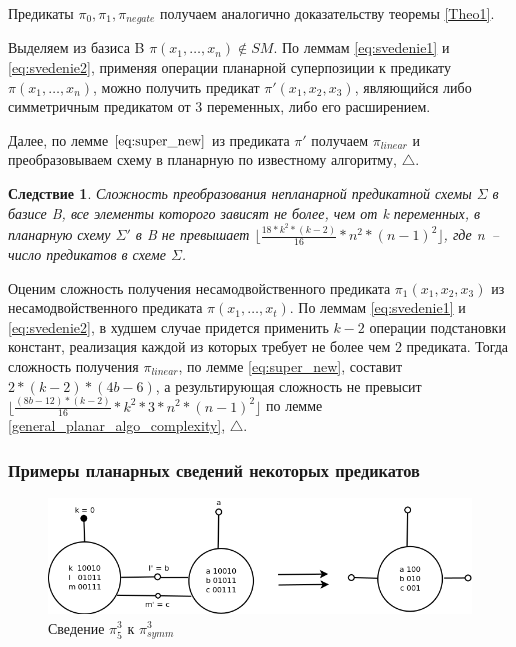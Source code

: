 \documentclass[12pt]{article}
\newtheorem{corollary}[theorem]{Следствие}
\newenvironment{proof}[1][Доказательство]{\begin{trivlist}
\item[\hskip \labelsep {\bfseries #1}]}{\end{trivlist}}
\begin{document}
\begin{proof}
Предикаты $\pi_0, \pi_1, \pi_{negate}$ получаем аналогично доказательству теоремы \ref{Theo1}.

Выделяем из базиса B $\pi(x_1, \dots, x_n) \notin SM$. По леммам \ref{eq:svedenie1} и \ref{eq:svedenie2}, 
применяя операции планарной суперпозиции к предикату $\pi(x_1, \dots, x_n)$, можно получить 
предикат $\pi'(x_1, x_2, x_3)$, являющийся либо симметричным предикатом от 3 переменных, либо его расширением. 

Далее, по лемме $\ref{eq:super_new}$ из предиката $\pi'$ получаем $\pi_{linear}$ и преобразовываем схему в планарную
по известному алгоритму, $\bigtriangleup$.
\end{proof}
\begin{corollary}
Сложность преобразования непланарной предикатной схемы $\Sigma$ в базисе B, 
все элементы которого зависят не более, чем от k переменных, 
в планарную схему $\Sigma'$ в B не превышает $\lfloor \frac{18 * k^2 * (k-2)}{16} * n^2 * (n-1)^2 \rfloor$, где n~-- число предикатов в схеме $\Sigma$.
\end{corollary}
\begin{proof}
Оценим сложность получения несамодвойственного предиката $\pi_1(x_1, x_2, x_3)$ из несамодвойственного предиката
$\pi(x_1, \dots, x_t)$. По леммам \ref{eq:svedenie1} и \ref{eq:svedenie2}, в худшем случае придется применить $k-2$ 
операции подстановки констант, реализация каждой из которых требует не более чем 2 предиката.
Тогда сложность получения $\pi_{linear}$, по лемме \ref{eq:super_new}, составит $2 * (k-2) * (4b - 6)$, а
результирующая сложность не превысит $\lfloor \frac{(8b - 12) * (k-2)}{16} * k^2 * 3 * n^2 * (n-1)^2 \rfloor $ по лемме 
\ref{general_planar_algo_complexity}, $\bigtriangleup$.
\end{proof}

\clearpage
\subsubsection{Примеры планарных сведений некоторых предикатов}

\begin{figure}[htb]
\centering
\includegraphics[width=1.0\textwidth]{3_2to3.png}
\caption{Сведение $\pi_5^3$ к $\pi_{symm}^3$ }
\label{fig:3_2to3}
\end{figure}
\end{document}
